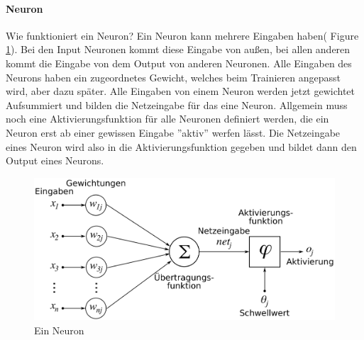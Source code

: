 \documentclass{hbrs-ecta-report}
\begin{document}
\FloatBarrier

 \paragraph{Neuron}
 Wie funktioniert ein Neuron? Ein Neuron kann mehrere Eingaben haben( Figure \ref{fig:Neuron}). Bei den Input Neuronen kommt diese Eingabe von außen, bei allen anderen kommt die Eingabe von dem Output von anderen Neuronen. Alle Eingaben des Neurons haben ein zugeordnetes Gewicht, welches beim Trainieren angepasst wird, aber dazu später. Alle Eingaben von einem Neuron werden jetzt gewichtet Aufsummiert und bilden die Netzeingabe für das eine Neuron. Allgemein muss noch eine Aktivierungsfunktion für alle Neuronen definiert werden, die ein Neuron erst ab einer gewissen Eingabe ''aktiv'' werfen lässt. Die Netzeingabe eines Neuron wird also in die Aktivierungsfunktion gegeben und bildet dann den Output eines Neurons.
 
\begin{figure}[h!]
	\includegraphics[width=\linewidth]{img/Neuron}
	\caption{Ein Neuron}
	\label{fig:Neuron}
\end{figure}
\end{document}
